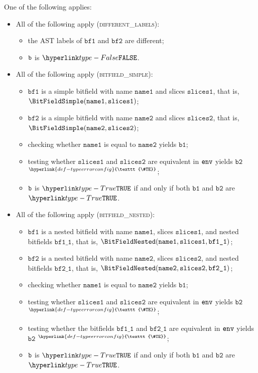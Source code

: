 \documentclass{book}
\newcommand\TypeErrorConfig[0]{\hyperlink{def-typeerrorconfig}{\texttt{\#TE}}}
\newcommand\ProseOrTypeError[0]{\hyperlink{def-proseortypeerror}{$^{\TypeErrorConfig}$}}
\newcommand\bfone[0]{\texttt{bf1}}
\newcommand\bftwo[0]{\texttt{bf2}}
\newcommand\bfoneone[0]{\texttt{bf1\_1}}
\newcommand\bftwoone[0]{\texttt{bf2\_1}}
\newcommand\vbone[0]{\texttt{b1}}
\newcommand\vbtwo[0]{\texttt{b2}}
\newcommand\nameone[0]{\texttt{name1}}
\newcommand\nametwo[0]{\texttt{name2}}
\newcommand\slicesone[0]{\texttt{slices1}}
\newcommand\slicestwo[0]{\texttt{slices2}}
\begin{document}
One of the following applies:
\begin{itemize}
  \item All of the following apply (\textsc{different\_labels}):
  \begin{itemize}
    \item the AST labels of $\bfone$ and $\bftwo$ are different;
    \item $\texttt{b}$ is $\False$.
  \end{itemize}

  \item All of the following apply (\textsc{bitfield\_simple}):
  \begin{itemize}
    \item $\bfone$ is a simple bitfield with name $\nameone$ and slices $\slicesone$, that is, \\ $\BitFieldSimple(\nameone, \slicesone)$;
    \item $\bftwo$ is a simple bitfield with name $\nametwo$ and slices $\slicestwo$, that is, \\ $\BitFieldSimple(\nametwo, \slicestwo)$;
    \item checking whether $\nameone$ is equal to $\nametwo$ yields $\vbone$;
    \item testing whether $\slicesone$ and $\slicestwo$ are equivalent in $\texttt{env}$ yields $\vbtwo$ \ProseOrTypeError;
    \item $\texttt{b}$ is $\True$ if and only if both $\vbone$ and $\vbtwo$ are $\True$.
  \end{itemize}

  \item All of the following apply (\textsc{bitfield\_nested}):
  \begin{itemize}
    \item $\bfone$ is a nested bitfield with name $\nameone$, slices $\slicesone$, and nested bitfields $\bfoneone$, that is,
          $\BitFieldNested(\nameone, \slicesone, \bfoneone)$;
    \item $\bftwo$ is a nested bitfield with name $\nametwo$, slices $\slicestwo$, and nested bitfields $\bftwoone$, that is,
          $\BitFieldNested(\nametwo, \slicestwo, \bftwoone)$;
    \item checking whether $\nameone$ is equal to $\nametwo$ yields $\vbone$;
    \item testing whether $\slicesone$ and $\slicestwo$ are equivalent in $\texttt{env}$ yields $\vbtwo$ \ProseOrTypeError;
    \item testing whether the bitfields $\bfoneone$ and $\bftwoone$ are equivalent in $\texttt{env}$ yields $\vbtwo$ \ProseOrTypeError;
    \item $\texttt{b}$ is $\True$ if and only if both $\vbone$ and $\vbtwo$ are $\True$.
  \end{itemize}


\end{itemize}
\end{document}
